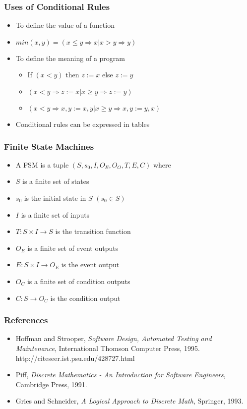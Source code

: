 \documentclass[t,12pt,numbers,fleqn]{beamer}
\begin{document}
\begin{frame}
\frametitle{Uses of Conditional Rules}
\begin{itemize}
\item To define the value of a function
\item $min(x,y) = (x \leq y \Rightarrow x | x > y \Rightarrow y)$
\item To define the meaning of a program
\begin{itemize}
\item If $(x < y)$ then $z := x$ else $z := y$
\item $(x < y \Rightarrow z := x | x \geq y \Rightarrow z:= y)$
\item $(x < y \Rightarrow x, y := x, y | x \geq y \Rightarrow x, y := y, x)$
\end{itemize}
\item Conditional rules can be expressed in tables
\end{itemize}
\end{frame}


\begin{frame}
\frametitle{Finite State Machines}
\begin{itemize}
\item A FSM is a tuple $(S, s_0, I, O_E, O_O, T, E, C)$ where
\item $S$ is a finite set of states
\item $s_0$ is the initial state in $S$ $(s_0 \in S)$
\item $I$ is a finite set of inputs
\item $T: S \times I \rightarrow S$ is the transition function
\item $O_E$ is a finite set of event outputs
\item $E: S\times I \rightarrow O_E$ is the event output
\item $O_C$ is a finite set of condition outputs
\item $C: S \rightarrow O_C$ is the condition output
\end{itemize}
\end{frame}


\begin{frame}
\frametitle{References}
\begin{itemize}
\item Hoffman and Strooper, \emph{Software Design, Automated Testing and Maintenance}, International Thomson Computer Press, 1995. http://citeseer.ist.psu.edu/428727.html
\item Piff, \emph{Discrete Mathematics - An Introduction for Software Engineers}, Cambridge Press, 1991.
\item Gries and Schneider, \emph{A Logical Approach to Discrete Math}, Springer, 1993.
\end{itemize}
\end{frame}

\end{document}

